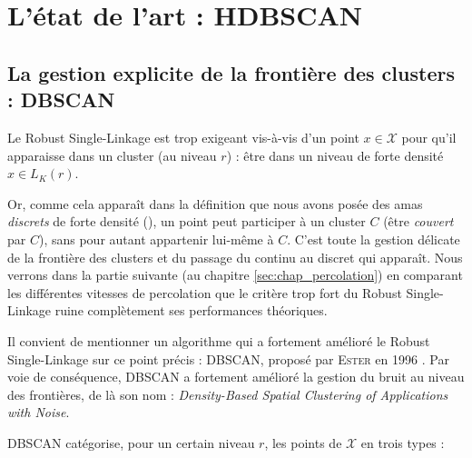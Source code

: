\section{L'état de l'art : HDBSCAN}
\label{sec:hdbscan}

\subsection{La gestion explicite de la frontière des clusters : DBSCAN}
\label{sec:dbscan}

Le Robust Single-Linkage est trop exigeant vis-à-vis d'un point $x \in \mathcal X$ pour qu'il apparaisse dans un cluster (au niveau $r$) : être dans un niveau de forte densité $x \in L_K(r)$. 

Or, comme cela apparaît dans la définition que nous avons posée des amas \emph{discrets} de forte densité (), un point peut participer à un cluster $C$ (être \emph{couvert} par $C$), sans pour autant appartenir lui-même à $C$. 
C'est toute la gestion délicate de la frontière des clusters et du passage du continu au discret qui apparaît.
Nous verrons dans la partie suivante (au chapitre \ref{sec:chap_percolation}) en comparant les différentes vitesses de percolation que le critère trop fort du Robust Single-Linkage ruine complètement ses performances théoriques.



Il convient de mentionner un algorithme qui a fortement amélioré le Robust Single-Linkage sur ce point précis : DBSCAN, proposé par \textsc{Ester} \etal en 1996 \cite{DBSCAN}.
Par voie de conséquence, DBSCAN a fortement amélioré la gestion du bruit au niveau des frontières, de là son nom : \emph{Density-Based Spatial Clustering of Applications with Noise}. 


DBSCAN catégorise, pour un certain niveau $r$, les points de $\mathcal{X}$ en trois types :

